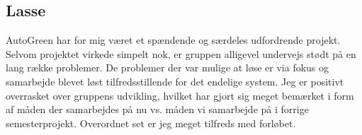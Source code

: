 \subsection{Lasse}

AutoGreen har for mig været et spændende og særdeles udfordrende projekt. Selvom projektet virkede simpelt nok, er gruppen alligevel undervejs stødt på en lang række problemer. De problemer der var mulige at løse er via fokus og samarbejde blevet løst tilfredsstillende for det endelige system. Jeg er positivt overrasket over gruppens udvikling, hvilket har gjort sig meget bemærket i form af måden der samarbejdes på nu vs. måden vi samarbejde på i forrige semesterprojekt. Overordnet set er jeg meget tilfreds med forløbet.